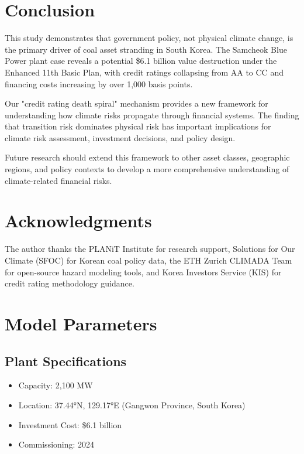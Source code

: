 \documentclass[11pt,a4paper]{article}
\begin{document}
\section{Conclusion}

This study demonstrates that government policy, not physical climate change, is the primary driver of coal asset stranding in South Korea. The Samcheok Blue Power plant case reveals a potential \$6.1 billion value destruction under the Enhanced 11th Basic Plan, with credit ratings collapsing from AA to CC and financing costs increasing by over 1,000 basis points.

Our "credit rating death spiral" mechanism provides a new framework for understanding how climate risks propagate through financial systems. The finding that transition risk dominates physical risk has important implications for climate risk assessment, investment decisions, and policy design.

Future research should extend this framework to other asset classes, geographic regions, and policy contexts to develop a more comprehensive understanding of climate-related financial risks.

\section*{Acknowledgments}

The author thanks the PLANiT Institute for research support, Solutions for Our Climate (SFOC) for Korean coal policy data, the ETH Zurich CLIMADA Team for open-source hazard modeling tools, and Korea Investors Service (KIS) for credit rating methodology guidance.




\appendix

\section{Model Parameters}

\subsection{Plant Specifications}
\begin{itemize}
\item Capacity: 2,100 MW
\item Location: 37.44°N, 129.17°E (Gangwon Province, South Korea)
\item Investment Cost: \$6.1 billion
\item Commissioning: 2024
\end{itemize}
\end{document}
